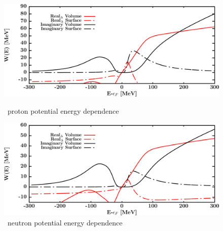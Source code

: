 \begin{figure}[hbtp]
    \centering
    \begin{minipage}{0.42\textwidth}
        \centering
        \includegraphics[width=\textwidth]{figures/sn124_protonPotentials.png}
        \caption*{\footnotesize\snFour\ proton potential energy dependence}
        \label{DOMFitData_sn124_proton_potentialComponent_energy}
    \end{minipage}\hspace{6pt}
    \begin{minipage}{0.42\textwidth}
        \centering
        \includegraphics[width=\textwidth]{figures/sn124_neutronPotentials.png}
        \caption*{\footnotesize\snFour\ neutron potential energy dependence}
        \label{DOMFitData_sn124_neutron_potentialComponent_energy}
    \end{minipage}
\end{figure}
